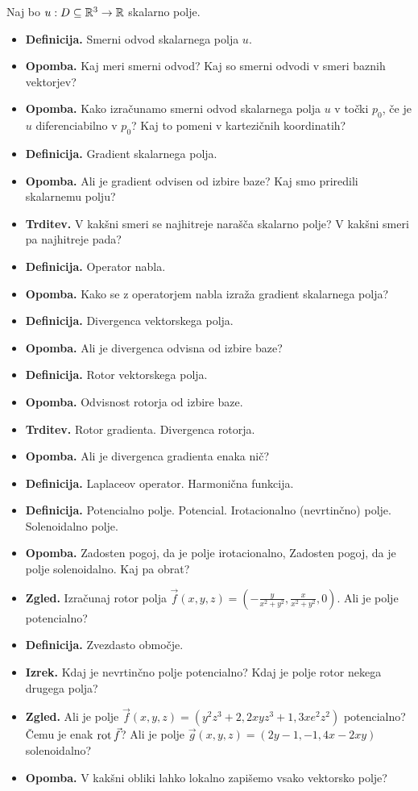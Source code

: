 \begin{enumerate}
    Naj bo \(u: D \subseteq \mathbb{R}^3 \to \mathbb{R}\) skalarno polje.
    \begin{itemize}
        \item \textbf{Definicija.} Smerni odvod skalarnega polja \(u\).
        \item \textbf{Opomba.} Kaj meri smerni odvod? Kaj so smerni odvodi v smeri baznih vektorjev?
        \item \textbf{Opomba.} Kako izračunamo smerni odvod skalarnega polja \(u\) v točki \(p_0\), če je \(u\) diferenciabilno v \(p_0\)? Kaj to pomeni v kartezičnih koordinatih?
        \item \textbf{Definicija.} Gradient skalarnega polja. 
        \item \textbf{Opomba.} Ali je gradient odvisen od izbire baze? Kaj smo priredili skalarnemu polju?
        \item \textbf{Trditev.} V kakšni smeri se najhitreje narašča skalarno polje? V kakšni smeri pa najhitreje pada?
        \item \textbf{Definicija.} Operator nabla.
        \item \textbf{Opomba.} Kako se z operatorjem nabla izraža gradient skalarnega polja? 
        \item \textbf{Definicija.} Divergenca vektorskega polja.
        \item \textbf{Opomba.} Ali je divergenca odvisna od izbire baze?
        \item \textbf{Definicija.} Rotor vektorskega polja.
        \item \textbf{Opomba.} Odvisnost rotorja od izbire baze.
        \item \textbf{Trditev.} Rotor gradienta. Divergenca rotorja.
        \item \textbf{Opomba.} Ali je divergenca gradienta enaka nič?
        \item \textbf{Definicija.} Laplaceov operator. Harmonična funkcija.
        \item \textbf{Definicija.} Potencialno polje. Potencial. Irotacionalno (nevrtinčno) polje. Solenoidalno polje.
        \item \textbf{Opomba.} Zadosten pogoj, da je polje irotacionalno, Zadosten pogoj, da je polje solenoidalno. Kaj pa obrat?
        \item \textbf{Zgled.} Izračunaj rotor polja \(\vec{f}(x,y,z) = \left(-\frac{y}{x^2 + y^2}, \frac{x}{x^2+y^2}, 0\right)\). Ali je polje potencialno?
        \item \textbf{Definicija.} Zvezdasto območje.
        \item \textbf{Izrek.} Kdaj je nevrtinčno polje potencialno? Kdaj je polje rotor nekega drugega polja?
        \item \textbf{Zgled.} Ali je polje \(\vec{f}(x,y,z) = (y^2z^3 + 2, 2xyz^3 + 1, 3xe^2z^2)\) potencialno? Čemu je enak \(\operatorname{rot} \vec{f}\)? Ali je polje \(\vec{g}(x,y,z) = (2y-1, -1, 4x - 2xy)\) solenoidalno?
        \item \textbf{Opomba.} V kakšni obliki lahko lokalno zapišemo vsako vektorsko polje?
    \end{itemize}
\end{enumerate}


